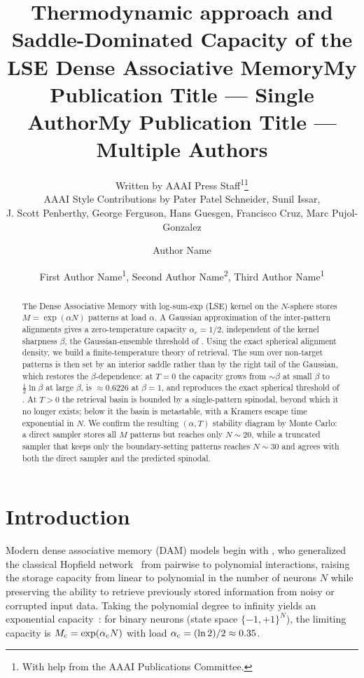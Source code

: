 \documentclass[letterpaper]{article} %
\title{\bfseries Thermodynamic approach and Saddle-Dominated Capacity
of the LSE Dense Associative Memory}
\author{
    Written by AAAI Press Staff\textsuperscript{\rm 1}\thanks{With help from the AAAI Publications Committee.}\\
    AAAI Style Contributions by Pater Patel Schneider,
    Sunil Issar,\\
    J. Scott Penberthy,
    George Ferguson,
    Hans Guesgen,
    Francisco Cruz\equalcontrib,
    Marc Pujol-Gonzalez\equalcontrib
}
\title{My Publication Title --- Single Author}
\author {
    Author Name
}
\title{My Publication Title --- Multiple Authors}
\author {
    First Author Name\textsuperscript{\rm 1},
    Second Author Name\textsuperscript{\rm 2},
    Third Author Name\textsuperscript{\rm 1}
}
\newcommand{\Bnet}{\beta}
\begin{document}
\maketitle

\begin{abstract}
The Dense Associative Memory with log-sum-exp (LSE) kernel on the $N$-sphere
stores $M = \exp(\alpha N)$ patterns at load $\alpha$. A Gaussian approximation
of the inter-pattern alignments gives a zero-temperature capacity
$\alpha_c = 1/2$, independent of the kernel sharpness $\Bnet$, the
Gaussian-ensemble threshold of \citet{lucibello2024exponential}. Using the exact
spherical alignment density, we build a finite-temperature theory of retrieval.
The sum over non-target patterns is then set by an interior saddle rather than by
the right tail of the Gaussian, which restores the $\Bnet$-dependence: at $T = 0$
the capacity grows from $\sim\Bnet$ at small $\Bnet$ to $\tfrac12 \ln\Bnet$ at
large $\Bnet$, is $\approx 0.6226$ at $\Bnet = 1$, and reproduces the exact
spherical threshold of \citeauthor{lucibello2024exponential}. At $T > 0$ the retrieval
basin is bounded by a single-pattern spinodal, beyond which it no longer exists;
below it the basin is metastable, with a Kramers escape time exponential in $N$.
We confirm the resulting $(\alpha, T)$ stability diagram by Monte Carlo: a direct
sampler stores all $M$ patterns but reaches only $N \sim 20$, while a truncated
sampler that keeps only the boundary-setting patterns reaches $N \sim 30$ and
agrees with both the direct sampler and the predicted spinodal.
\end{abstract}




\section{Introduction}

Modern dense associative memory (DAM) models begin with \citet{krotov2016dense},
who generalized the classical Hopfield network~\citep{Hopfield1982} from pairwise
to polynomial interactions, raising the storage capacity from linear to
polynomial in the number of neurons $N$ while preserving the ability to
retrieve previously stored information from noisy or corrupted input data. 
Taking the polynomial degree to infinity yields an exponential capacity~\citep{demircigil2017model}:
for binary neurons (state space $\{-1,+1\}^{N}$), the limiting capacity is
$M_{\rm c} = \exp(\alpha_{\rm c} N)$ with load $\alpha_{\rm c} = (\ln 2)/2 \approx 0.35$.
\end{document}
